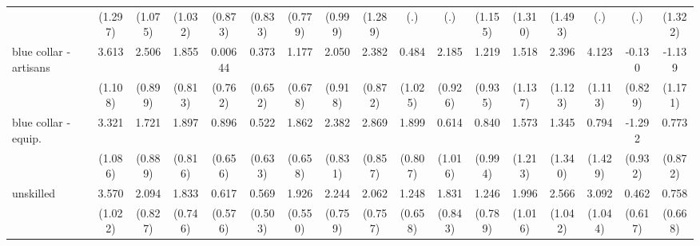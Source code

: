 {\begin{tabular}{l*{16}{c}}
                    &     (1.297)         &     (1.075)         &     (1.032)         &     (0.873)         &     (0.833)         &     (0.779)         &     (0.999)         &     (1.289)         &         (.)         &         (.)         &     (1.155)         &     (1.310)         &     (1.493)         &         (.)         &         (.)         &     (1.322)         \\
[1em]
blue collar - artisans&       3.613\sym{**} &       2.506\sym{**} &       1.855\sym{*}  &     0.00644         &       0.373         &       1.177         &       2.050\sym{*}  &       2.382\sym{**} &       0.484         &       2.185\sym{*}  &       1.219         &       1.518         &       2.396\sym{*}  &       4.123\sym{***}&      -0.130         &      -1.139         \\
                    &     (1.108)         &     (0.899)         &     (0.813)         &     (0.762)         &     (0.652)         &     (0.678)         &     (0.918)         &     (0.872)         &     (1.025)         &     (0.926)         &     (0.935)         &     (1.137)         &     (1.123)         &     (1.113)         &     (0.829)         &     (1.171)         \\
[1em]
blue collar - equip.&       3.321\sym{**} &       1.721         &       1.897\sym{*}  &       0.896         &       0.522         &       1.862\sym{**} &       2.382\sym{**} &       2.869\sym{***}&       1.899\sym{*}  &       0.614         &       0.840         &       1.573         &       1.345         &       0.794         &      -1.292         &       0.773         \\
                    &     (1.086)         &     (0.889)         &     (0.816)         &     (0.656)         &     (0.633)         &     (0.658)         &     (0.831)         &     (0.857)         &     (0.807)         &     (1.016)         &     (0.994)         &     (1.213)         &     (1.340)         &     (1.429)         &     (0.932)         &     (0.872)         \\
[1em]
unskilled           &       3.570\sym{***}&       2.094\sym{*}  &       1.833\sym{*}  &       0.617         &       0.569         &       1.926\sym{***}&       2.244\sym{**} &       2.062\sym{**} &       1.248         &       1.831\sym{*}  &       1.246         &       1.996\sym{*}  &       2.566\sym{*}  &       3.092\sym{**} &       0.462         &       0.758         \\
                    &     (1.022)         &     (0.827)         &     (0.746)         &     (0.576)         &     (0.503)         &     (0.550)         &     (0.759)         &     (0.757)         &     (0.658)         &     (0.843)         &     (0.789)         &     (1.016)         &     (1.042)         &     (1.044)         &     (0.617)         &     (0.668)         \\

\end{tabular}}
